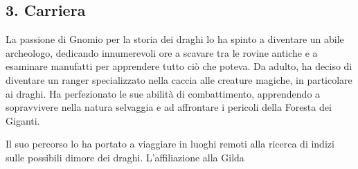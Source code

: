 \subsection{3. Carriera}\label{carriera}


La passione di Gnomio per la storia dei draghi lo ha spinto a diventare
un abile archeologo, dedicando innumerevoli ore a scavare tra le rovine
antiche e a esaminare manufatti per apprendere tutto ciò che poteva. Da
adulto, ha deciso di diventare un ranger specializzato nella caccia alle
creature magiche, in particolare ai draghi. Ha perfezionato le sue
abilità di combattimento, apprendendo a sopravvivere nella natura
selvaggia e ad affrontare i pericoli della Foresta dei Giganti.

Il suo percorso lo ha portato a viaggiare in luoghi remoti alla ricerca
di indizi sulle possibili dimore dei draghi. L'affiliazione alla Gilda

